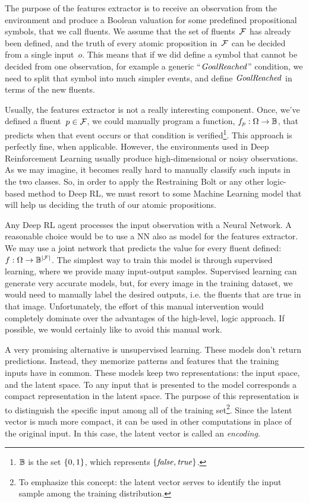 The purpose of the features extractor is to receive an observation from the
environment and produce a Boolean valuation for some predefined propositional
symbols, that we call fluents. We assume that the set of fluents~$\mathcal{F}$
has already been defined, and the truth of every atomic proposition
in~$\mathcal{F}$ can be decided from a single input~$o$. This means that if we
did define a symbol that cannot be decided from one observation, for example a
generic ``$\text{\textit{GoalReached}}$'' condition, we need to split that symbol into
much simpler events, and define $\text{\textit{GoalReached}}$ in terms of the new
fluents.

Usually, the features extractor is not a really interesting component. Once,
we've defined a fluent~$p \in \mathcal{F}$, we could manually program a
function, $f_p: \Omega \to \mathbb{B}$, that predicts when that event occurs or that
condition is verified\footnote{$\mathbb{B}$ is the set $\{0, 1\}$, which represents
$\{\text{\textit{false}}, \text{\textit{true}}\}$.}.  This approach is perfectly fine, when applicable.
However, the environments used in Deep Reinforcement Learning usually produce
high-dimensional or noisy observations. As we may imagine, it becomes really
hard to manually classify such inputs in the two classes. So, in order to
apply the Restraining Bolt or any other logic-based method to Deep RL, we
must resort to some Machine Learning model that will help us deciding the
truth of our atomic propositions.

Any Deep RL agent processes the input observation with a Neural Network. A
reasonable choice would be to use a NN also as model for the features
extractor. We may use a joint network that predicts the value for every fluent
defined: $f: \Omega \to \mathbb{B}^{\lvert\mathcal{F}\rvert}$. The simplest way to train this
model is through supervised learning, where we provide many input-output
samples. Supervised learning can generate very accurate models, but, for every
image in the training dataset, we would need to manually label the desired
outputs, i.e. the fluents that are true in that image. Unfortunately, the
effort of this manual intervention would completely dominate over the
advantages of the high-level, logic approach. If possible, we would certainly
like to avoid this manual work. 

A very promising alternative is unsupervised learning. These models don't
return predictions. Instead, they memorize patterns and features that the
training inputs have in common. These models keep two representations: the
input space, and the latent space. To any input that is presented to the
model corresponds a compact representation in the latent space. The purpose
of this representation is to distinguish the specific input among all of the
training set\footnote{To emphasize this concept: the latent vector serves to
identify the input sample among the training distribution.}. Since the latent
vector is much more compact, it can be used in other computations in place of
the original input. In this case, the latent vector is called an
\emph{encoding}.

